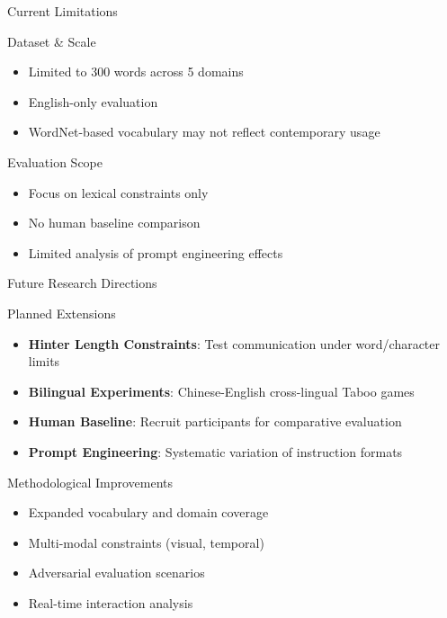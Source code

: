 \documentclass[aspectratio=169]{beamer}
\begin{document}
\begin{frame}{Current Limitations}
\begin{block}{Dataset \& Scale}
\begin{itemize}
    \item Limited to 300 words across 5 domains
    \item English-only evaluation
    \item WordNet-based vocabulary may not reflect contemporary usage
\end{itemize}
\end{block}

\begin{block}{Evaluation Scope}
\begin{itemize}
    \item Focus on lexical constraints only
    \item No human baseline comparison
    \item Limited analysis of prompt engineering effects
\end{itemize}
\end{block}
\end{frame}

\begin{frame}{Future Research Directions}
\begin{block}{Planned Extensions}
\begin{itemize}
    \item \textbf{Hinter Length Constraints}: Test communication under word/character limits
    \item \textbf{Bilingual Experiments}: Chinese-English cross-lingual Taboo games
    \item \textbf{Human Baseline}: Recruit participants for comparative evaluation
    \item \textbf{Prompt Engineering}: Systematic variation of instruction formats
\end{itemize}
\end{block}

\begin{block}{Methodological Improvements}
\begin{itemize}
    \item Expanded vocabulary and domain coverage
    \item Multi-modal constraints (visual, temporal)
    \item Adversarial evaluation scenarios
    \item Real-time interaction analysis
\end{itemize}
\end{block}
\end{frame}
\end{document}
